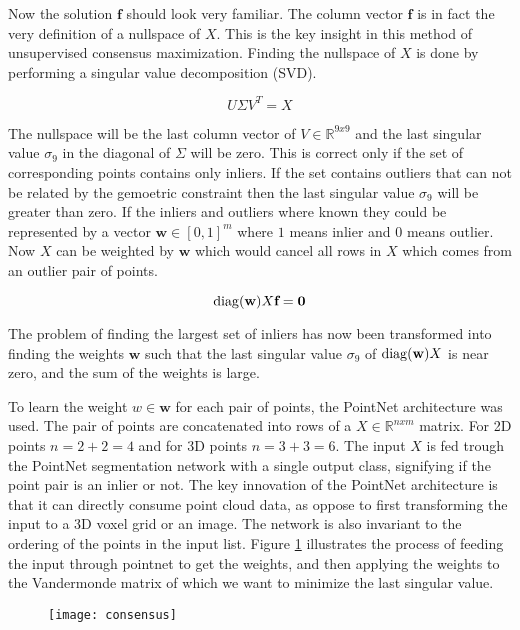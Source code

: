Now the solution $\textbf{f}$ should look very familiar. The column vector $\textbf{f}$ is in fact the very definition of a nullspace of $X$. This is the key insight in this method of unsupervised consensus maximization. Finding the nullspace of $X$ is done by performing a singular value decomposition (SVD).

\[
U\Sigma V^T=X
\]

The nullspace will be the last column vector of $V \in \mathbb{R}^{9x9}$ and the last singular value $\sigma_9$ in the diagonal of $\Sigma$ will be zero. This is correct only if the set of corresponding points contains only inliers. If the set contains outliers that can not be related by the gemoetric constraint then the last singular value $\sigma_9$ will be greater than zero. If the inliers and outliers where known they could be represented by a vector $\textbf{w} \in [0,1]^m$ where $ 1 $ means inlier and $ 0 $ means outlier. Now $X$ can be weighted by $\textbf{w}$ which would cancel all rows in $X$ which comes from an outlier pair of points.

\[
\operatorname{diag}(\textbf{w}) X \textbf{f} = \textbf{0}
\] 

The problem of finding the largest set of inliers has now been transformed into finding the weights $\textbf{w}$ such that the last singular value $\sigma_9$ of $\operatorname{diag}(\textbf{w})X$ is near zero, and the sum of the weights is large.

To learn the weight $w \in \textbf{w}$ for each pair of points, the PointNet\cite{pointnet} architecture was used. The pair of points are concatenated into rows of a $ X \in \mathbb{R}^{nxm} $ matrix. For 2D points $n = 2+2=4$ and for 3D points $n=3+3=6$. The input $X$ is fed trough the PointNet segmentation network with a single output class, signifying if the point pair is an inlier or not. The key innovation of the PointNet architecture is that it can directly consume point cloud data, as oppose to first transforming the input to a 3D voxel grid or an image. The network is also invariant to the ordering of the points in the input list. Figure \ref{fig:consensus} illustrates the process of feeding the input through pointnet to get the weights, and then applying the weights to the Vandermonde matrix of which we want to minimize the last singular value.

\begin{figure}[H]
	\centering
	\texttt{[image: consensus]}
	\caption{}
	\label{fig:consensus}
\end{figure}

